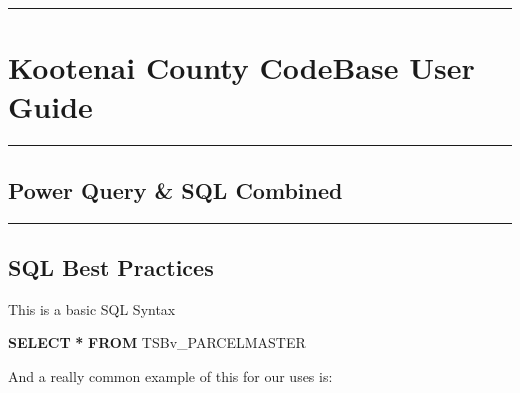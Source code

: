 \documentclass[
]{article}
\author{}
\date{\vspace{-2.5em}}
\newenvironment{Shaded}{\begin{snugshade}}{\end{snugshade}}
\newcommand{\KeywordTok}[1]{\textcolor[rgb]{0.13,0.29,0.53}{\textbf{#1}}}
\newcommand{\NormalTok}[1]{#1}
\newcommand{\OperatorTok}[1]{\textcolor[rgb]{0.81,0.36,0.00}{\textbf{#1}}}
\begin{document}
\begin{center}\rule{0.5\linewidth}{0.5pt}\end{center}

\hypertarget{kootenai-county-codebase-user-guide}{%
\section{Kootenai County CodeBase User
Guide}\label{kootenai-county-codebase-user-guide}}

\begin{center}\rule{0.5\linewidth}{0.5pt}\end{center}

\hypertarget{power-query-sql-combined}{%
\subsection{Power Query \& SQL
Combined}\label{power-query-sql-combined}}

\begin{center}\rule{0.5\linewidth}{0.5pt}\end{center}

\hypertarget{sql-best-practices}{%
\subsection{SQL Best Practices}\label{sql-best-practices}}

This is a basic SQL Syntax

\begin{Shaded}
\begin{Highlighting}[]

\KeywordTok{SELECT} \OperatorTok{*}
\KeywordTok{FROM}\NormalTok{ TSBv\_PARCELMASTER}
\end{Highlighting}
\end{Shaded}

And a really common example of this for our uses is:
\end{document}
